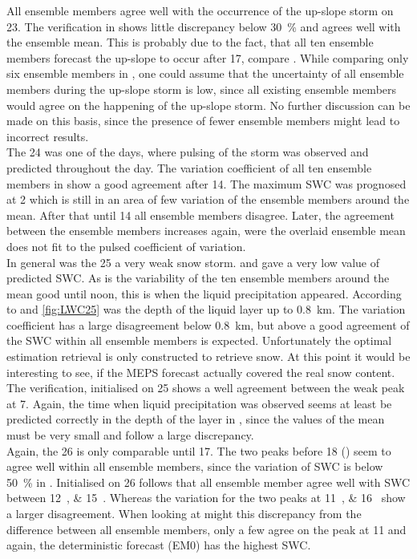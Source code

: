All ensemble members agree well with the occurrence of the up-slope storm on \SI{23}{\dec}. The verification in  shows little discrepancy below \SI{30}{\percent} and agrees well with the ensemble mean. This is probably due to the fact, that all ten ensemble members forecast the up-slope to occur after \SI{17}{\UTC}, compare . While comparing only six ensemble members in , one could assume that the uncertainty of all ensemble members during the up-slope storm is low, since all existing ensemble members would agree on the happening of the up-slope storm. No further discussion can be made on this basis, since the presence of fewer ensemble members might lead to incorrect results.
\\
The \SI{24}{\dec} was one of the days, where pulsing of the storm was observed and predicted throughout the day. The variation coefficient of all ten ensemble members in  show a good agreement after \SI{14}{\UTC}. The maximum SWC was prognosed at \SI{2}{\UTC} which is still in an area of few variation of the ensemble members around the mean. After that until \SI{14}{\UTC} all ensemble members  disagree. Later, the agreement between the ensemble members increases again, were the overlaid ensemble mean does not fit to the pulsed coefficient of variation. 
\\
In general was the \SI{25}{\dec} a very weak snow storm.  and  gave a very low value of predicted SWC. As  is the variability of the ten ensemble members around the mean good until noon, this is when the liquid precipitation appeared. According to  and \ref{fig:LWC25} was the depth of the liquid layer up to \SI{0.8}{\km}. The variation coefficient has a large disagreement below \SI{0.8}{\km}, but above a good agreement of the SWC within all ensemble members is expected. Unfortunately the optimal estimation retrieval is only constructed to retrieve snow. At this point it would be interesting to see, if the MEPS forecast actually covered the real snow content. The verification, initialised on \SI{25}{\dec} shows a well agreement between the weak peak  at \SI{7}{\UTC}. Again, the time when liquid precipitation was observed seems at least be predicted correctly in the depth of the layer in , since the values of the mean must be very small and follow a large discrepancy.
\\
Again, the \SI{26}{\dec} is only comparable until \SI{17}{\UTC}. The two peaks before \SI{18}{\UTC} () seem to agree well within all ensemble members, since the variation of SWC is below \SI{50}{\percent} in . Initialised on \SI{26}{\dec} follows that all ensemble member agree well with SWC between \SIlist{12;15}{\UTC}. Whereas the variation for the two peaks at \SIlist{11;16}{\UTC} show a larger disagreement. When looking at  might this discrepancy from the difference between all ensemble members, only a few agree on the peak at \SI{11}{\UTC} and again, the deterministic forecast (EM0) has the highest SWC.
